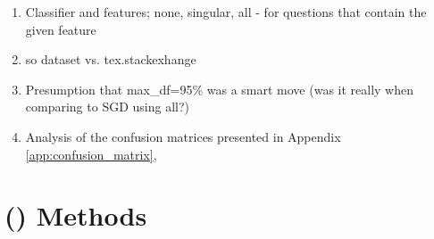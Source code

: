 \clearpage
{}
\begin{enumerate}
	\item Classifier and features; none, singular, all - for questions that contain the given feature
	\item \gls{so} dataset vs. tex.stackexhange
	\item Presumption that max\_df=95\% was a smart move (was it really when comparing to SGD using all?)
	\item Analysis of the confusion matrices presented in Appendix \ref{app:confusion_matrix}, \pageref{app:confusion_matrix}
\end{enumerate}




\clearpage
\section[Artificial Intelligence Methods]{ () Methods}
\label{sec:ai_methods}



